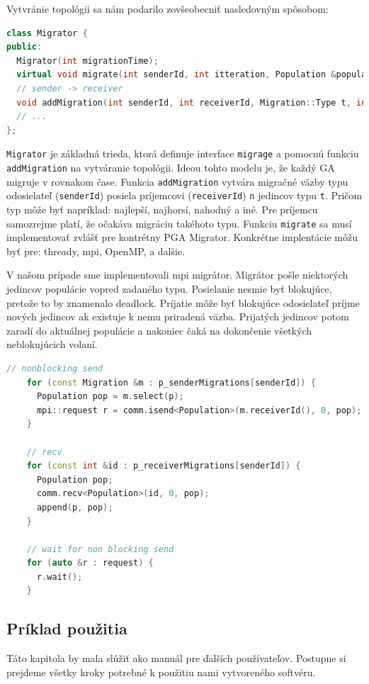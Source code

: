Vytvránie topológii sa nám podarilo zovšeobecniť nasledovným spôsobom:
\begin{lstlisting}[language=c++]
class Migrator {
public:
  Migrator(int migrationTime);
  virtual void migrate(int senderId, int itteration, Population &population) = 0;
  // sender -> receiver
  void addMigration(int senderId, int receiverId, Migration::Type t, int n)
  // ...
};
\end{lstlisting}
\texttt{Migrator} je základná trieda, ktorá definuje interface \texttt{migrage} a pomocnú funkciu \texttt{addMigration} na vytváranie topológii.
Ideou tohto modelu je, že každý GA migruje v rovnakom čase.
Funkcia \texttt{addMigration} vytvára migračné väzby typu odosielateľ (\texttt{senderId}) posiela príjemcovi (\texttt{receiverId}) \texttt{n} jedincov typu \texttt{t}.
Pričom typ môže byť napríklad: najlepší, najhorsí, nahodný a iné. Pre príjemcu samozrejme platí, že očakáva migráciu takéhoto typu.
Funkciu \texttt{migrate} sa musí implementovať zvlášť pre kontrétny PGA Migrator. Konkrétne implentácie môžu byť pre: thready, \acrshort{mpi}, OpenMP, a dalšie. 

V našom prípade sme implementovali \acrshort{mpi} migrátor. Migrátor pošle niektorých jedincov populácie vopred zadaného typu.
Posielanie nesmie byť blokujúce, pretože to by znamenalo deadlock. Príjatie môže byť blokujúce odosielateľ príjme nových jedincov ak existuje k nemu priradená väzba.
Prijatých jedincov potom zaradí do aktuálnej populácie a nakoniec čaká na dokončenie všetkých neblokujúcich volaní.
\begin{lstlisting}[language=c++, caption={Pseudokód MpiMigrator}]
    // nonblocking send
    for (const Migration &m : p_senderMigrations[senderId]) {
      Population pop = m.select(p);
      mpi::request r = comm.isend<Population>(m.receiverId(), 0, pop);
    }

    // recv
    for (const int &id : p_receiverMigrations[senderId]) {
      Population pop;
      comm.recv<Population>(id, 0, pop);
      append(p, pop);
    }

    // wait for non blocking send
    for (auto &r : request) {
      r.wait();
    }
\end{lstlisting}


\subsection{Príklad použitia}
Táto kapitola by mala slúžiť ako manuál pre ďalších používateľov.
Postupne si prejdeme všetky kroky potrebné k použitiu nami vytvoreného softvéru.

